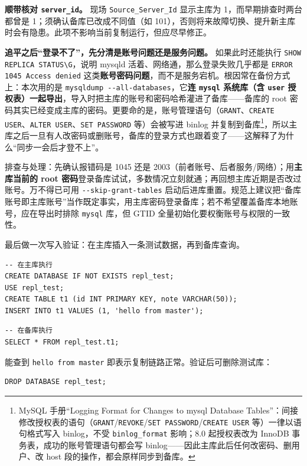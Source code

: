 \documentclass[12pt,UTF8]{ctexbook}
\begin{document}
\textbf{顺带核对 \texttt{server\_id}。} 现场 \texttt{Source\_Server\_Id} 显示主库为 1，而早期排查时两台都曾是 1；须确认备库已改成不同值（如 101），否则将来故障切换、提升新主库时会有隐患。此项不影响当前复制运行，但应尽早修正。

\textbf{追平之后“登录不了”，先分清是账号问题还是服务问题。} 如果此时还能执行 \verb|SHOW REPLICA STATUS\G|，说明 mysqld 活着、网络通，那么登录失败几乎都是 \texttt{ERROR 1045 Access denied} 这类\textbf{账号密码问题}，而不是服务宕机。根因常在备份方式上：本次用的是 \verb|mysqldump --all-databases|，它\textbf{连 \texttt{mysql} 系统库（含 \texttt{user} 授权表）一起导出}，导入时把主库的账号和密码哈希灌进了备库——备库的 root 密码其实已经变成主库的密码。更要命的是，账号管理语句（\verb|GRANT|、\verb|CREATE USER|、\verb|ALTER USER|、\verb|SET PASSWORD| 等）会被写进 binlog 并复制到备库\footnote{MySQL 手册“Logging Format for Changes to mysql Database Tables”：间接修改授权表的语句（\texttt{GRANT}/\texttt{REVOKE}/\texttt{SET PASSWORD}/\texttt{CREATE USER} 等）一律以语句格式写入 binlog，不受 \texttt{binlog\_format} 影响；8.0 起授权表改为 InnoDB 事务表，成功的账号管理语句都会写 binlog——因此主库此后任何改密码、删用户、改 host 段的操作，都会原样同步到备库。}，所以主库之后一旦有人改密码或删账号，备库的登录方式也跟着变了——这解释了为什么“同步一会后才登不上”。

排查与处理：先确认报错码是 1045 还是 2003（前者账号、后者服务/网络）；用\textbf{主库当前的 root 密码}登录备库试试，多数情况立刻就通；再回想主库近期是否改过账号。万不得已可用 \verb|--skip-grant-tables| 启动后进库重置。规范上建议把“备库账号即主库账号”当作既定事实，用主库密码登录备库；若不希望覆盖备库本地账号，应在导出时排除 \texttt{mysql} 库，但 GTID 全量初始化要权衡账号与权限的一致性。

最后做一次写入验证：在主库插入一条测试数据，再到备库查询。

\begin{lstlisting}
-- 在主库执行
CREATE DATABASE IF NOT EXISTS repl_test;
USE repl_test;
CREATE TABLE t1 (id INT PRIMARY KEY, note VARCHAR(50));
INSERT INTO t1 VALUES (1, 'hello from master');
\end{lstlisting}

\begin{lstlisting}
-- 在备库执行
SELECT * FROM repl_test.t1;
\end{lstlisting}

能查到 \texttt{hello from master} 即表示复制链路正常。验证后可删除测试库：

\begin{lstlisting}
DROP DATABASE repl_test;
\end{lstlisting}
\end{document}
